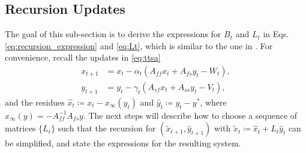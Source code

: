 \subsection{Recursion Updates}\label{sec:recursion_mse}
The goal of this sub-section is to derive the expressions for $B_t$ and $L_t$ in Eqs. \eqref{eq:recursion_expression} and \eqref{eq:Lt}, which is similar to the one in \citep{konda2004convergence}. 
For convenience, recall the updates in \eqref{eq:ttsa}
\begin{equation*}
    \begin{split}
        x_{t+1} &= x_t - \alpha_t \left(A_{ff} x_t + A_{fs} y_t - W_t \right),
        \\
        y_{t+1} &= y_t - \gamma_t \left(A_{sf} x_t + A_{ss} y_t - V_t \right),
    \end{split}
\end{equation*}
and the residues $\hat{x}_t \coloneqq x_t - x_\infty (y_t)$ and $\hat{y}_t \coloneqq y_t - y^*$, where $x_\infty (y) = -A_{ff}^{-1} A_{fs} y$. 
The next steps will describe how to choose a sequence of matrices $\{L_t\}$ such that the recursion for $(\tilde{x}_{t+1}, \hat{y}_{t+1})$ with $\tilde{x}_t \coloneqq \hat{x}_t + L_t \hat{y}_t$ can be simplified, and state the expressions for the resulting system. 



